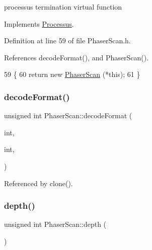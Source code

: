 processus termination virtual function 

Implements \hyperlink{classProcessus_aca8856f6d6d7b7e1fe941f298dcbb502}{Processus}.



Definition at line 59 of file Phaser\+Scan.\+h.



References decode\+Format(), and Phaser\+Scan().


\begin{DoxyCode}
59                      \{
60     \textcolor{keywordflow}{return} \textcolor{keyword}{new} \hyperlink{classPhaserScan_afba6f21affa3e014fe4019dfd9664672}{PhaserScan} (*\textcolor{keyword}{this});
61   \}
\end{DoxyCode}
\mbox{\label{classPhaserScan_ad01a0ce0223859a138e3a78023a924bb}} 
\subsubsection{\texorpdfstring{decode\+Format()}{decodeFormat()}}
{\footnotesize\ttfamily unsigned int Phaser\+Scan\+::decode\+Format (\begin{DoxyParamCaption}\item[{unsigned}]{int,  }\item[{unsigned}]{int,  }\item[{\hyperlink{classRAM}{R\+AM} $\ast$}]{ }\end{DoxyParamCaption})\hspace{0.3cm}{\ttfamily [protected]}}



Referenced by clone().

\mbox{\label{classPhaserScan_ad2d47975431e765c906ba51eeeb4365d}} 
\subsubsection{\texorpdfstring{depth()}{depth()}}
{\footnotesize\ttfamily unsigned int Phaser\+Scan\+::depth (\begin{DoxyParamCaption}{ }\end{DoxyParamCaption})\hspace{0.3cm}{\ttfamily [inline]}}



